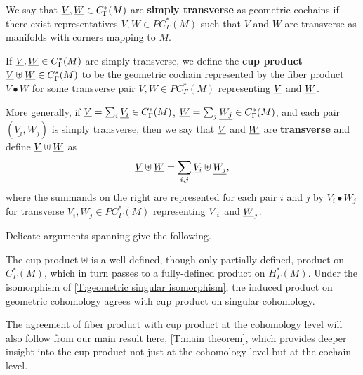 \begin{definition}\label{D:cochain trans}
	We say that $\underline{V}, \underline{W} \in C^*_{\Gamma}(M)$ are \textbf{simply transverse} as geometric cochains if there exist representatives $V,W \in PC^*_\Gamma(M)$ such that $V$ and $W$ are transverse as manifolds with corners mapping to $M$.

	If $\underline{V}, \underline{W} \in C^*_{\Gamma}(M)$ are simply transverse, we define the \textbf{cup product} $\underline{V} \uplus \underline{W} \in C^*_\Gamma(M)$ to be the geometric cochain represented by the fiber product $V \bullet W$ for some transverse pair $V,W \in PC^*_\Gamma(M)$ representing $\underline{V}$ and $\underline{W}$.

	More generally, if $\underline{V} = \sum_i \underline{V_i} \in C_\Gamma^*(M)$, $\underline{W} = \sum_j \underline{W_j} \in C_\Gamma^*(M)$, and each pair $(\underline{V_i},\underline{W_j})$ is simply transverse, then
	we say that $\underline{V}$ and $\underline{W}$ are \textbf{transverse} and define $\underline{V}\uplus\underline{W}$ as
	$$\underline{V}\uplus\underline{W} = \sum_{i,j} \underline{V_i}\uplus \underline{W_j},$$
	where the summands on the right are represented for each pair $i$ and $j$ by $V_i \bullet W_j$ for transverse $V_i, W_j \in PC^*_\Gamma(M)$ representing $\underline{V}_i$ and $\underline{W}_j$.
\end{definition}

Delicate arguments spanning \cite[Theorems 7.9, 7.14, 7.22, and 7.29]{medina2022foundations} give the following.

\begin{theorem}\label{P:product}
	The cup product $\uplus$ is a well-defined, though only partially-defined, product on $C_\Gamma^*(M)$, which in turn passes to a fully-defined product on $H_\Gamma^*(M)$.
	Under the isomorphism of \cref{T:geometric singular isomorphism}, the induced product on geometric cohomology agrees with cup product on singular cohomology.
\end{theorem}

The agreement of fiber product with cup product at the cohomology level will also follow from our main result here, \cref{T:main theorem}, which provides deeper insight into the cup product not just at the cohomology level but at the cochain level.